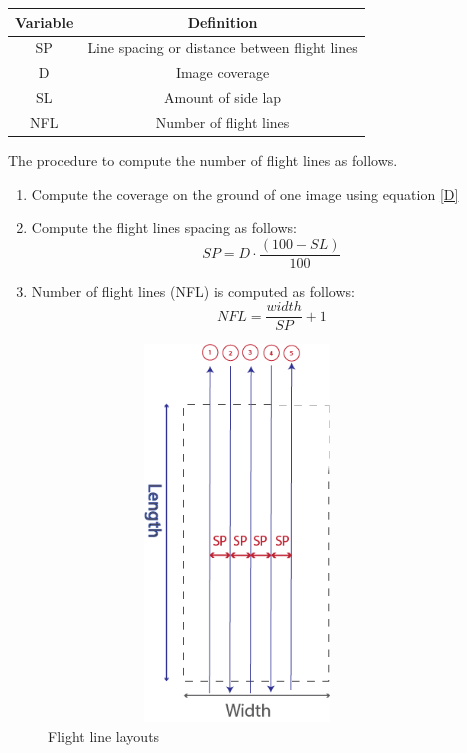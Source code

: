 \begin{table}[H]
\centering
\begin{tabular}{|c|c|}
\hline
\textbf{Variable} & \textbf{Definition}                           \\ \hline
SP                & Line spacing or distance between flight lines \\ \hline
D                 & Image coverage                                \\ \hline
SL                & Amount of side lap                            \\ \hline
NFL               & Number of flight lines                        \\ \hline
\end{tabular}
\label{Amount of flight line equation variable definition}
\end{table}
The procedure to compute the number of flight lines as follows.
\begin{enumerate}
\item Compute the coverage on the ground of one image using equation \ref{D}
\item Compute the flight lines spacing as follows:
\begin{equation}
SP = D\cdot \frac{(100-SL)}{100}
\end{equation}
\item Number of flight lines (NFL) is computed as follows:
\begin{equation}
NFL=\frac{width}{SP}+1
\end{equation}
\end{enumerate}
\begin{figure}[H]
\centering
\includegraphics[width=10cm,height=10cm,keepaspectratio]{imagenes/Line_layout.png}
\caption {Flight line layouts}
\label{fig:flight_lines}
\end{figure}

